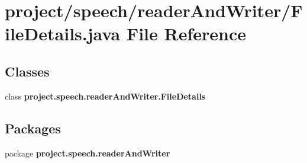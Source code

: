 \section{project/speech/reader\+And\+Writer/\+File\+Details.java File Reference}
\label{_file_details_8java}
\subsection*{Classes}
\begin{DoxyCompactItemize}
\item 
class {\bf project.\+speech.\+reader\+And\+Writer.\+File\+Details}
\end{DoxyCompactItemize}
\subsection*{Packages}
\begin{DoxyCompactItemize}
\item 
package {\bf project.\+speech.\+reader\+And\+Writer}
\end{DoxyCompactItemize}
